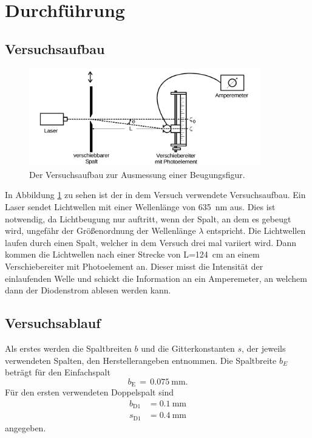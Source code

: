 \documentclass[
  bibliography=totoc,     %
  captions=tableheading,  %
  titlepage=firstiscover, %
]{scrartcl}
\begin{document}
\section{Durchführung}
\subsection{Versuchsaufbau}
\label{sec:Versuchsaufbau}
\begin{figure}[htb]
  \centering
  \includegraphics[width=0.9\textwidth]{V4063.png}
  \caption{Der Versuchsaufbau zur Ausmessung einer Beugungsfigur. \cite{anleitung}}
  \label{fig:V4063}
\end{figure}
In Abbildung \ref{fig:V4063} zu sehen ist der in dem Versuch verwendete Versuchsaufbau. Ein Laser sendet Lichtwellen mit einer Wellenlänge von \SI{635}{\nano\metre} aus. Dies ist notwendig, da Lichtbeugung nur auftritt, wenn der Spalt, an dem es gebeugt wird, ungefähr der Größenordnung der Wellenlänge $\lambda$ entspricht. Die Lichtwellen laufen durch einen Spalt, welcher in dem Versuch drei mal variiert wird. Dann kommen die Lichtwellen nach einer Strecke von L=\SI{124}{\centi\metre} an einem Verschiebereiter mit Photoelement an. Dieser misst die Intensität der einlaufenden Welle und schickt die Information an ein Amperemeter, an welchem dann der Diodenstrom ablesen werden kann.
\clearpage
\subsection{Versuchsablauf}
\label{sec:Versuchsablauf}
Als erstes werden die Spaltbreiten $b$ und die Gitterkonstanten $s$, der jeweils verwendeten Spalten, den Herstellerangeben entnommen.
Die Spaltbreite $b_E$ beträgt für den Einfachspalt
\begin{equation*}
  b_\mathup{E}\,=\,\SI{0.075}{\milli\metre}.
\end{equation*}
Für den ersten verwendeten Doppelspalt sind
\begin{align*}
  b_\mathup{D1} &= \SI{0.1}{\milli\metre}\\
  s_\mathup{D1} &= \SI{0.4}{\milli\metre}
\end{align*}
angegeben.
\end{document}
